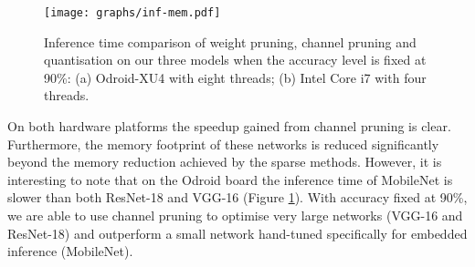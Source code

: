\documentclass[conference]{IEEEtran}
\begin{document}
\begin{figure}[t]
\centering
\texttt{[image: graphs/inf-mem.pdf]}
\caption{Inference time comparison of weight pruning, channel pruning and quantisation on our three models when the accuracy level is fixed at 90\%: (a) Odroid-XU4 with eight threads; (b) Intel Core i7 with four threads.}
\label{fig:inf-mem}
\end{figure}On both hardware platforms the speedup gained from channel pruning is clear. Furthermore, the memory footprint of these networks is reduced significantly beyond the memory reduction achieved by the sparse methods. However, it is interesting to note that on the Odroid board the inference time of MobileNet is slower than both ResNet-18 and VGG-16 (Figure \ref{fig:inf-mem}). With accuracy fixed at 90\%, we are able to use channel pruning to optimise very large networks (VGG-16 and ResNet-18) and outperform a small network hand-tuned specifically for embedded inference (MobileNet).
\end{document}

